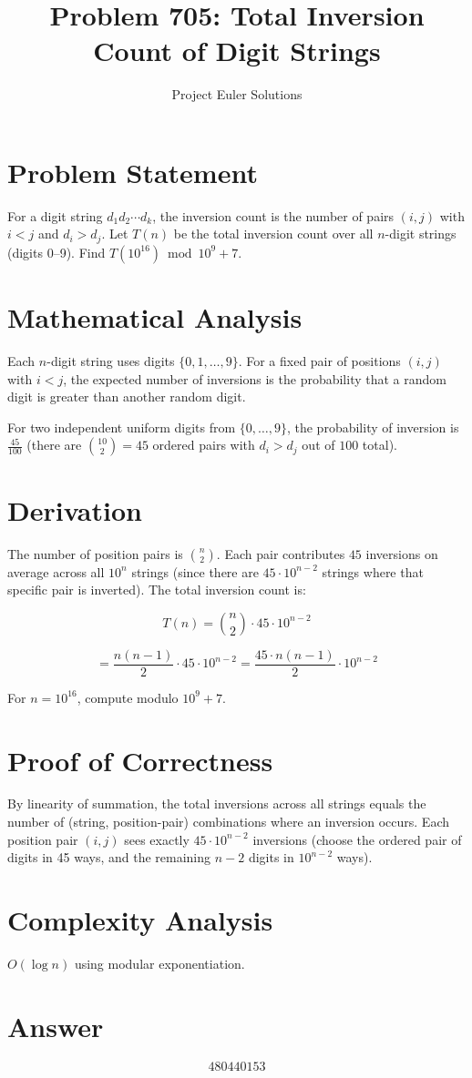 \documentclass[11pt]{article}
\title{Problem 705: Total Inversion Count of Digit Strings}
\author{Project Euler Solutions}
\date{}
\begin{document}
\maketitle

\section{Problem Statement}
For a digit string $d_1 d_2 \cdots d_k$, the inversion count is the number of pairs $(i,j)$ with $i < j$ and $d_i > d_j$. Let $T(n)$ be the total inversion count over all $n$-digit strings (digits 0--9). Find $T(10^{16}) \bmod 10^9 + 7$.

\section{Mathematical Analysis}
Each $n$-digit string uses digits $\{0,1,\ldots,9\}$. For a fixed pair of positions $(i,j)$ with $i<j$, the expected number of inversions is the probability that a random digit is greater than another random digit.

For two independent uniform digits from $\{0,\ldots,9\}$, the probability of inversion is $\frac{45}{100}$ (there are $\binom{10}{2}=45$ ordered pairs with $d_i > d_j$ out of $100$ total).

\section{Derivation}
The number of position pairs is $\binom{n}{2}$. Each pair contributes $45$ inversions on average across all $10^n$ strings (since there are $45 \cdot 10^{n-2}$ strings where that specific pair is inverted). The total inversion count is:

$$T(n) = \binom{n}{2} \cdot 45 \cdot 10^{n-2}$$

$$= \frac{n(n-1)}{2} \cdot 45 \cdot 10^{n-2} = \frac{45 \cdot n(n-1)}{2} \cdot 10^{n-2}$$

For $n = 10^{16}$, compute modulo $10^9+7$.

\section{Proof of Correctness}
By linearity of summation, the total inversions across all strings equals the number of (string, position-pair) combinations where an inversion occurs. Each position pair $(i,j)$ sees exactly $45 \cdot 10^{n-2}$ inversions (choose the ordered pair of digits in 45 ways, and the remaining $n-2$ digits in $10^{n-2}$ ways).

\section{Complexity Analysis}
$O(\log n)$ using modular exponentiation.

\section{Answer}

\[
\boxed{480440153}
\]
\end{document}
